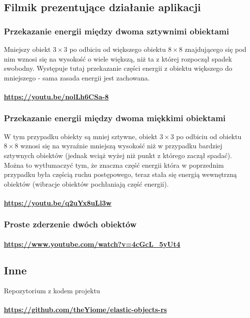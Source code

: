 \documentclass[12pt, letterpaper]{report}
\begin{document}
    \subsection{Filmik prezentujące działanie aplikacji}

    \subsubsection{Przekazanie energii między dwoma sztywnimi obiektami}

    Mniejszy obiekt $3 \times 3$ po odbiciu od większego obiektu $8 \times  8$ znajdującego się pod nim wznosi się na
    wysokość o wiele większą, niż ta z której rozpoczął spadek swobodny.
    Występuje tutaj przekazanie części energii z obiektu większego do mniejszego - sama zasada energii jest zachowana.

    \paragraph{
        \url{https://youtu.be/nolLh6CSa-8}
    }

    \subsubsection{Przekazanie energii między dwoma miękkimi obiektami}
    W tym przypadku obiekty są mniej sztywne,
    obiekt $3 \times 3$ po odbiciu od obiektu $8 \times  8$ wznosi się na wyraźnie mniejszą wysokość niż w przypadku bardziej sztywnych obiektów
    (jednak wciąż wyżej niż punkt z którego zaczął spadać). Można to wytłumaczyć tym,
    że znaczna część energii która w poprzednim przypadku była częścią ruchu postępowego,
    teraz stała się energią wewnętrzną obiektów (wibracje obiektów pochłaniają część energii).

    \paragraph{
        \url{https://youtu.be/q2uYx8uLl3w}
    }

    \subsubsection{Proste zderzenie dwóch obiektów}
    \paragraph{
        \url{https://www.youtube.com/watch?v=4cGcL_5yUt4}
    }

    \subsection{Inne}
    Repozytorium z kodem projektu
    \paragraph{
        \url{https://github.com/theYiome/elastic-objects-rs}
}
\end{document}
